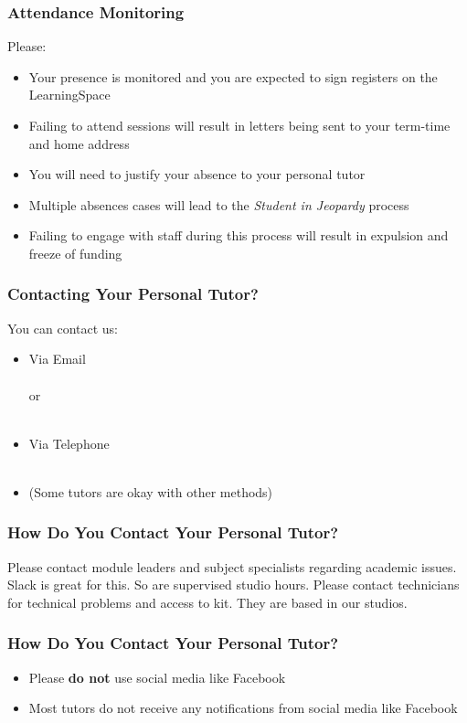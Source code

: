 \begin{frame}
	\frametitle{Attendance Monitoring}	
	
	Please:
	
	\begin{itemize}
		\item Your presence is monitored and you are expected to sign registers on the LearningSpace
		\item Failing to attend sessions will result in letters being sent to your term-time and home address
		\item You will need to justify your absence to your personal tutor
		\item Multiple absences cases will lead to the \textit{Student in Jeopardy} process
		\item Failing to engage with staff during this process will result in expulsion and freeze of funding
	\end{itemize}
\end{frame}

\begin{frame}
	\frametitle{Contacting Your Personal Tutor?}	
	
	You can contact us:
	
	\begin{itemize}
		\item Via Email
		\\~\\
		or
		\\~\\
		\item Via Telephone
		\\~\\
		\item (Some tutors are okay with other methods)
	\end{itemize}
\end{frame}

\begin{frame}
	\frametitle{How Do You Contact Your Personal Tutor?}
	
	Please contact module leaders and subject specialists regarding academic issues. Slack is great for this. So are supervised studio hours. Please contact technicians for technical problems and access to kit. They are based in our studios.	

\end{frame}

\begin{frame}
	\frametitle{How Do You Contact Your Personal Tutor?}	
	\begin{itemize}
		\item Please \textbf{do not} use social media like Facebook
		\item Most tutors do not receive any notifications from social media like Facebook
	\end{itemize}
\end{frame}

